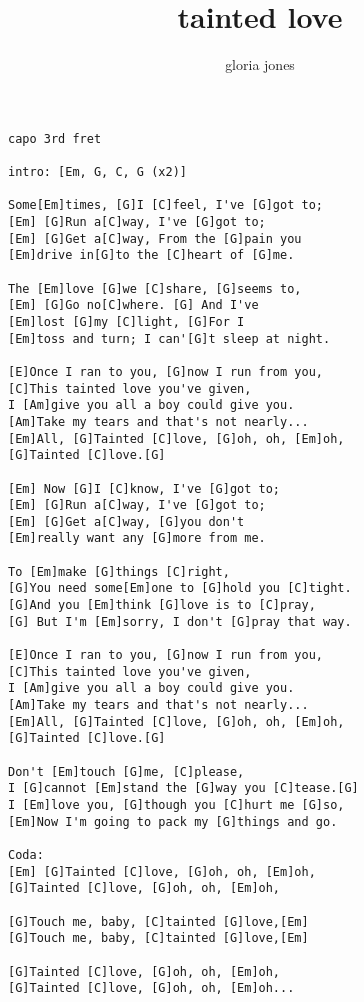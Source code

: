 \author{gloria jones}
\title{tainted love}
\maketitle
\begin{verbatim}
capo 3rd fret

intro: [Em, G, C, G (x2)]

Some[Em]times, [G]I [C]feel, I've [G]got to;
[Em] [G]Run a[C]way, I've [G]got to;
[Em] [G]Get a[C]way, From the [G]pain you
[Em]drive in[G]to the [C]heart of [G]me.

The [Em]love [G]we [C]share, [G]seems to,
[Em] [G]Go no[C]where. [G] And I've
[Em]lost [G]my [C]light, [G]For I
[Em]toss and turn; I can'[G]t sleep at night.

[E]Once I ran to you, [G]now I run from you,
[C]This tainted love you've given,
I [Am]give you all a boy could give you.
[Am]Take my tears and that's not nearly...
[Em]All, [G]Tainted [C]love, [G]oh, oh, [Em]oh,
[G]Tainted [C]love.[G]

[Em] Now [G]I [C]know, I've [G]got to;
[Em] [G]Run a[C]way, I've [G]got to;
[Em] [G]Get a[C]way, [G]you don't
[Em]really want any [G]more from me.

To [Em]make [G]things [C]right,
[G]You need some[Em]one to [G]hold you [C]tight.
[G]And you [Em]think [G]love is to [C]pray,
[G] But I'm [Em]sorry, I don't [G]pray that way.

[E]Once I ran to you, [G]now I run from you,
[C]This tainted love you've given,
I [Am]give you all a boy could give you.
[Am]Take my tears and that's not nearly...
[Em]All, [G]Tainted [C]love, [G]oh, oh, [Em]oh,
[G]Tainted [C]love.[G]

Don't [Em]touch [G]me, [C]please,
I [G]cannot [Em]stand the [G]way you [C]tease.[G]
I [Em]love you, [G]though you [C]hurt me [G]so,
[Em]Now I'm going to pack my [G]things and go.

Coda:
[Em] [G]Tainted [C]love, [G]oh, oh, [Em]oh,
[G]Tainted [C]love, [G]oh, oh, [Em]oh,

[G]Touch me, baby, [C]tainted [G]love,[Em]
[G]Touch me, baby, [C]tainted [G]love,[Em]

[G]Tainted [C]love, [G]oh, oh, [Em]oh,
[G]Tainted [C]love, [G]oh, oh, [Em]oh...
\end{verbatim}